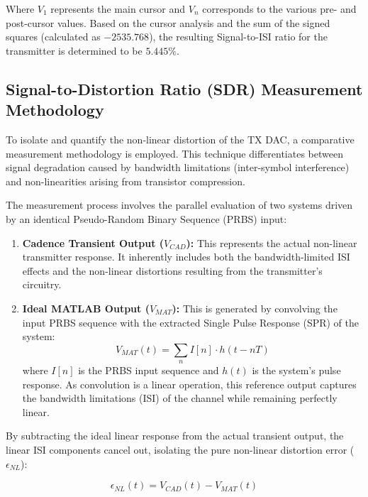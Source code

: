 Where $V_{1}$ represents the main cursor and $V_{n}$ corresponds to the various pre- and post-cursor values. 
Based on the cursor analysis and the sum of the signed squares (calculated as $-2535.768$), 
the resulting Signal-to-ISI ratio for the transmitter is determined to be $5.445\%$.

\subsection{Signal-to-Distortion Ratio (SDR) Measurement Methodology}
\label{sec:sdr_methodology}

To isolate and quantify the non-linear distortion of the TX DAC, a comparative measurement methodology is employed. 
This technique differentiates between signal degradation caused by bandwidth limitations (inter-symbol interference) 
and non-linearities arising from transistor compression.

The measurement process involves the parallel evaluation of two systems driven by an identical Pseudo-Random Binary Sequence (PRBS) input:

\begin{enumerate}
    \item \textbf{Cadence Transient Output ($V_{CAD}$):} This represents the actual non-linear transmitter response. 
    It inherently includes both the bandwidth-limited ISI effects and the non-linear distortions resulting from the transmitter's circuitry.
    \item \textbf{Ideal MATLAB Output ($V_{MAT}$):} This is generated by convolving the input PRBS sequence with the 
    extracted Single Pulse Response (SPR) of the system:
    \begin{equation}
        V_{MAT}(t) = \sum_{n} I[n] \cdot h(t - nT)
    \end{equation}
    where $I[n]$ is the PRBS input sequence and $h(t)$ is the system's pulse response. As convolution is a linear operation, 
    this reference output captures the bandwidth limitations (ISI) of the channel while remaining perfectly linear.
\end{enumerate}

By subtracting the ideal linear response from the actual transient output, the linear ISI components cancel out, 
isolating the pure non-linear distortion error ($\epsilon_{NL}$):

\begin{equation}
    \epsilon_{NL}(t) = V_{CAD}(t) - V_{MAT}(t)
\end{equation}

